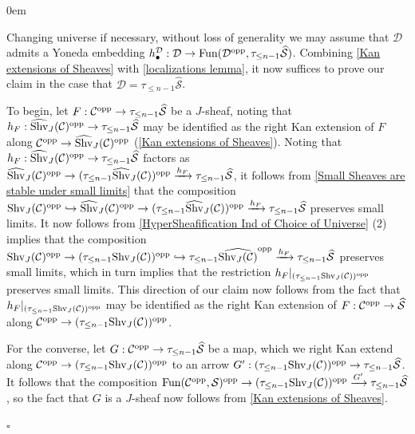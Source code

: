 \documentclass[10pt]{article}
\newcommand{\mS}{\mathcal S}
\newcommand{\C}{\mathcal C}
\newcommand{\cD}{\mathcal{D}}
\renewcommand{\qed}{\hfill$\square$}
\renewenvironment{proof}{\begin{addmargin}[1em]{0em}\begin{newproof}}{\end{newproof}\end{addmargin}\qed}
\theoremstyle{witharg}
\theoremstyle{witharg}
\theoremstyle{witharg2}
\begin{document}
\begin{proof}

Changing universe if necessary, without loss of generality we may assume that $\cD$ admits a Yoneda embedding $h^\cD_\bullet:\cD\rightarrow \textnormal{Fun}(\cD^{\textnormal{opp}},\tau_{\leq n-1}\widehat{\mS})$. Combining \ref{Kan extensions of Sheaves} with \ref{localizations lemma}, it now suffices to prove our claim in the case that $\cD=\tau_{\leq n-1}\widehat{\mS}$.


To begin, let $F:\C^{\textnormal{opp}}\rightarrow \tau_{\leq n-1}\widehat{\mS}$ be a $J$-sheaf, noting that $h_F:\widehat{\textnormal{Shv}}_{J}(\C)^{\textnormal{opp}}\rightarrow \tau_{\leq n-1}\widehat{\mS}$ may be identified as the right Kan extension of $F$ along $\C^{\textnormal{opp}}\rightarrow \widehat{\textnormal{Shv}}_{J}(\C)^{\textnormal{opp}}$ (\ref{Kan extensions of Sheaves}). Noting that $h_F:\widehat{\textnormal{Shv}}_{J}(\C)^{\textnormal{opp}}\rightarrow \tau_{\leq n-1}\widehat{\mS}$ factors as $\widehat{\textnormal{Shv}}_{J}(\C)^{\textnormal{opp}}\rightarrow(\tau_{\leq n-1}\widehat{\textnormal{Shv}}_{J}(\C))^{\textnormal{opp}}\xrightarrow{h_F}\tau_{\leq n-1}\widehat{\mS}$, it follows from \ref{Small Sheaves are stable under small limits} that the composition $\textnormal{Shv}_J(\C)^{\textnormal{opp}}\hookrightarrow \widehat{\textnormal{Shv}}_J(\C)^{\textnormal{opp}}\rightarrow (\tau_{\leq n-1}\widehat{\textnormal{Shv}}_{J}(\C))^{\textnormal{opp}}\xrightarrow{h_F}\tau_{\leq n-1}\widehat{\mS}$ preserves small limits. It now follows from \ref{HyperSheafification Ind of Choice of Universe} (2) implies that the composition $\textnormal{Shv}_J(\C)^{\textnormal{opp}}\rightarrow (\tau_{\leq n-1}\textnormal{Shv}_J(\C))^{\textnormal{opp}}\hookrightarrow \tau_{\leq n-1}\widehat{\textnormal{Shv}_J(\C)}^{\textnormal{opp}}\xrightarrow{h_F}\tau_{\leq n-1}\widehat{\mS}$ preserves small limits, which in turn implies that the restriction $h_F|_{(\tau_{\leq n-1}\textnormal{Shv}_J(\C))^{\textnormal{opp}}}$ preserves small limits. This direction of our claim now follows from the fact that $h_F|_{(\tau_{\leq n-1}\textnormal{Shv}_J(\C))^{\textnormal{opp}}}$ may be identified as the right Kan extension of $F:\C^{\textnormal{opp}}\rightarrow \widehat{\mS}$ along $\C^{\textnormal{opp}}\rightarrow (\tau_{\leq n-1}\textnormal{Shv}_J(\C))^{\textnormal{opp}}$.
  
 For the converse, let $G:\C^{\textnormal{opp}}\rightarrow \tau_{\leq n-1}\widehat{\mS}$ be a map, which we right Kan extend along $\C^{\textnormal{opp}}\rightarrow (\tau_{\leq n-1}\textnormal{Shv}_J(\C))^{\textnormal{opp}}$ to an arrow $G^\prime:(\tau_{\leq n-1}\textnormal{Shv}_J(\C))^{\textnormal{opp}}\rightarrow \tau_{\leq n-1}\widehat{\mS}$. It follows that the composition $\textnormal{Fun}(\C^{\textnormal{opp}},\mS)^{\textnormal{opp}}\rightarrow (\tau_{\leq n-1}\textnormal{Shv}_J(\C))^{\textnormal{opp}}\xrightarrow{G^\prime} \tau_{\leq n-1}\widehat{\mS}$, so the fact that $G$ is a $J$-sheaf now follows from \ref{Kan extensions of Sheaves}. 
 
\end{proof}
\end{document}

